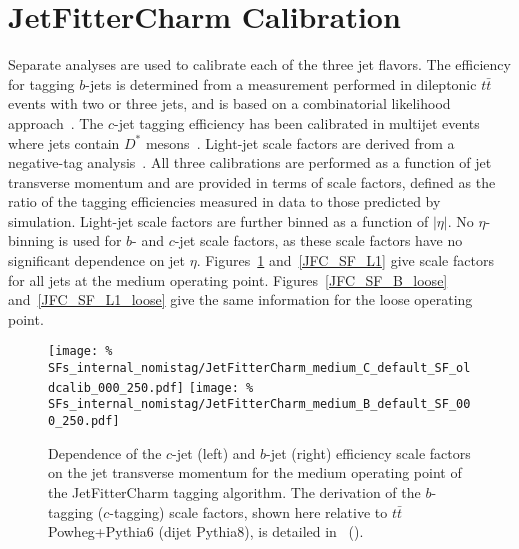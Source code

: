 \section{JetFitterCharm Calibration}
\label{sec:calib}
Separate analyses are used to calibrate each of the three jet flavors.
The efficiency for tagging $b$-jets is determined from a measurement performed in dileptonic $t\bar{t}$ events with two or three jets, and is based on a combinatorial likelihood approach~\cite{Giacinto}.
The $c$-jet tagging efficiency has been calibrated in multijet events where jets contain $D^*$ mesons~\cite{bc2014}.
Light-jet scale factors are derived from a negative-tag analysis~\cite{bc2014}.
All three calibrations are performed as a function of jet transverse momentum and are provided in terms of scale factors, defined as the ratio of the tagging efficiencies measured in data to those predicted by simulation.
Light-jet scale factors are further binned as a function of $|\eta|$. No $\eta$-binning is used for $b$- and $c$-jet scale factors, as these scale factors have no significant dependence on jet $\eta$.
Figures~\ref{JFC_SF_B} and~\ref{JFC_SF_L1} give scale factors for all jets at the medium operating point. Figures~\ref{JFC_SF_B_loose} and~\ref{JFC_SF_L1_loose} give the same information for the loose operating point.

\newcommand{\lSF}{as detailed in~\cite{bc2014}. The scale factors are measured relative to dijet Pythia8+EvtGen} %
\newcommand{\cSF}{as detailed in~\cite{bc2014}. The scale factors are measured relative to dijet Pythia8} %
\newcommand{\bSF}{as detailed in~\cite{Giacinto}. The scale factors are measured relative to $t \bar{t}$ Powheg+Pythia6} %
\newcommand{\bcSF}{The derivation of the $b$-tagging ($c$-tagging) scale factors, shown here relative to $t \bar{t}$ Powheg+Pythia6 (dijet Pythia8), is detailed in~\cite{Giacinto} (\hspace{1sp}\cite{bc2014})}

\begin{figure}
  \centering
    \texttt{[image: \%
SFs\_internal\_nomistag/JetFitterCharm\_medium\_C\_default\_SF\_oldcalib\_000\_250.pdf]}
  \texttt{[image: \%
SFs\_internal\_nomistag/JetFitterCharm\_medium\_B\_default\_SF\_000\_250.pdf]}
  \caption{Dependence of the $c$-jet (left) and $b$-jet (right) efficiency scale factors on the jet transverse momentum for the medium operating point of the
    JetFitterCharm tagging algorithm. \bcSF.}
  \label{JFC_SF_B}
\end{figure}

